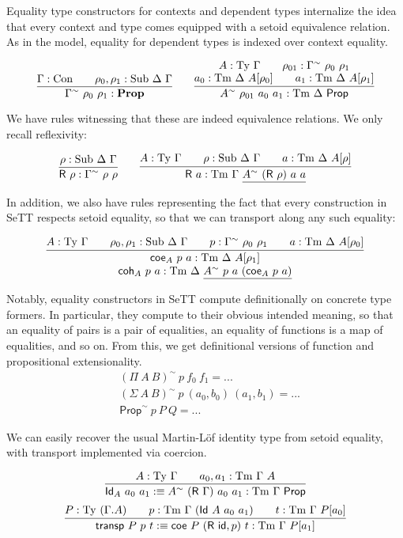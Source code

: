 \documentclass{easychair}
\newcommand{\GG}{\Gamma}
\newcommand{\DD}{\Delta}
\newcommand{\GD}{\Delta}
\newcommand{\R}{\textsf{R}}
\newcommand{\Id}{\textsf{Id}}
\newcommand{\coe}{\textsf{coe}}
\newcommand{\coh}{\textsf{coh}}
\newcommand{\tyj}[2]{#2 : \Ty\ #1}
\newcommand{\tmj}[3]{#2 : \Tm\ #1\ #3}
\newcommand{\subj}[3]{#1 : \mathrm{Sub}\ #2\ #3}
\newcommand{\Prop}{\textsf{Prop}}
\newcommand{\Con}{\mathrm{Con}}
\newcommand{\Ty}{\mathrm{Ty}}
\newcommand{\Tm}{\mathrm{Tm}}
\newcommand{\Sub}{\mathrm{Sub}}
\newcommand{\metaprop}{\mathbf{Prop}}
\begin{document}
Equality type constructors for contexts and dependent types internalize the idea
that every context and type comes equipped with a setoid equivalence
relation. As in the model, equality for dependent types is indexed over context
equality.

\[
\infer{
  \GG^\sim\ \rho_0\ \rho_1 : \metaprop
}{
  \GG : \Con \qquad \subj{\rho_0, \rho_1}{\DD}{\GG}
}
\qquad
\infer{
  A^{\sim}\ \rho_{01}\ a_0\ a_1 : \Tm\ \DD\ \Prop
}{
  \deduce{
    a_0 : \Tm\ \DD\ A[\rho_0] \qquad a_1 : \Tm\ \DD\ A[\rho_1]
  }{
    A : \Ty\ \GG \qquad \rho_{01} : \GG^{\sim}\ \rho_0\ \rho_1
  }
}
\]

We have rules witnessing that these are indeed equivalence relations. We only
recall reflexivity:

\[
\infer{
  \textsf{R}\ \rho : \GG^\sim\ \rho\ \rho
}{
  \rho : \Sub\ \GD\ \GG
}
\qquad
\infer{
  \textsf{R}\ a : \Tm\ \GG\ \underline{A^\sim\ (\textsf{R}\ \rho)\ a\ a}
}{
  A : \Ty\ \GG
  \qquad
  \rho : \Sub\ \GD\ \GG
  \qquad
  a : \Tm\ \GD\ A[\rho]
}
\]

In addition, we also have rules representing the fact that every construction in
SeTT respects setoid equality, so that we can transport along any such equality:

    \[
    \infer{
      \deduce{
        \tmj{\GD}{\coh_A\ p\ a}{\underline{A^\sim\ p\ a\ (\coe_A\ p\ a)}}
      }{
        \tmj{\GD}{\coe_A\ p\ a}{A[\rho_1]}
      }
    }{
      \tyj{\GG}{A} \qquad \subj{\rho_0, \rho_1}{\GD}{\GG} \qquad
      p : \GG^\sim\ \rho_0\ \rho_1\qquad
      \tmj{\GD}{a}{A[\rho_0]}
    }
    \]

Notably, equality constructors in SeTT compute definitionally on concrete type
formers. In particular, they compute to their obvious intended meaning, so that
an equality of pairs is a pair of equalities, an equality of functions is a map
of equalities, and so on. From this, we get definitional versions of function
and propositional extensionality.
%
\begin{align*}
  & (\Pi\ A\ B)^\sim\ p\ f_0\ f_1 = ... \\
  & (\Sigma\ A\ B)^\sim\ p\ (a_0, b_0)\ (a_1, b_1) = ... \\
  & \Prop^\sim\ p\ P\ Q = ...
\end{align*}

We can easily recover the usual Martin-L\"of identity type from setoid equality,
with transport implemented via coercion.

\[
\infer{
  \textsf{Id}_A\ a_0\ a_1 :\equiv A^{\sim}\ (\R\ \GG)\ a_0\ a_1 : \Tm\ \GG\ \Prop
}{
  \tyj{\GG}{A} \qquad \tmj{\GG}{a_0, a_1}{A}
}
\]
\[
\infer{
  \textsf{transp}\ P\ p\ t :\equiv
    \coe\ P\ (\textsf{R}\ \textsf{id} , p)\ t : \Tm\ \GG\ P[a_1]
}{
  P : \Ty\ (\GG . A)
  \qquad
  p : \Tm\ \GG\ (\Id\ A\ a_0\ a_1)
  \qquad
  t : \Tm\ \GG\ P[a_0]
}
\]
\end{document}
